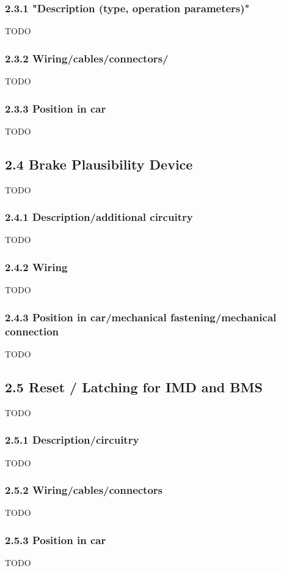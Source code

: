 \documentclass{article}
\begin{document}
\subsubsection*{2.3.1 "Description (type, operation parameters)"}
TODO

\subsubsection*{2.3.2 Wiring/cables/connectors/}
TODO

\subsubsection*{2.3.3 Position in car}
TODO

\subsection*{2.4 Brake Plausibility Device}
TODO

\subsubsection*{2.4.1 Description/additional circuitry}
TODO

\subsubsection*{2.4.2 Wiring}
TODO

\subsubsection*{2.4.3 Position in car/mechanical fastening/mechanical connection}
TODO

\subsection*{2.5 Reset / Latching for IMD and BMS}
TODO

\subsubsection*{2.5.1 Description/circuitry}
TODO

\subsubsection*{2.5.2 Wiring/cables/connectors}
TODO

\subsubsection*{2.5.3 Position in car}
TODO
\end{document}
